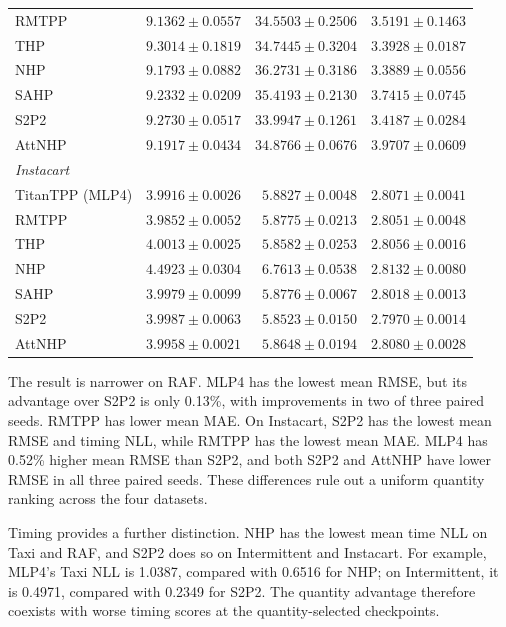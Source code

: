 \documentclass[runningheads]{llncs}
\begin{document}
\begin{table}[p]
\begin{tabular}{lrrr}
RMTPP & $\mathbf{9.1362\pm0.0557}$ & $34.5503\pm0.2506$ & $3.5191\pm0.1463$\\
THP & $9.3014\pm0.1819$ & $34.7445\pm0.3204$ & $3.3928\pm0.0187$\\
NHP & $9.1793\pm0.0882$ & $36.2731\pm0.3186$ & $\mathbf{3.3889\pm0.0556}$\\
SAHP & $9.2332\pm0.0209$ & $35.4193\pm0.2130$ & $3.7415\pm0.0745$\\
S2P2 & $9.2730\pm0.0517$ & $33.9947\pm0.1261$ & $3.4187\pm0.0284$\\
AttNHP & $9.1917\pm0.0434$ & $34.8766\pm0.0676$ & $3.9707\pm0.0609$\\
\midrule
\multicolumn{4}{l}{\textit{Instacart}}\\
TitanTPP (MLP4) & $3.9916\pm0.0026$ & $5.8827\pm0.0048$ & $2.8071\pm0.0041$\\
RMTPP & $\mathbf{3.9852\pm0.0052}$ & $5.8775\pm0.0213$ & $2.8051\pm0.0048$\\
THP & $4.0013\pm0.0025$ & $5.8582\pm0.0253$ & $2.8056\pm0.0016$\\
NHP & $4.4923\pm0.0304$ & $6.7613\pm0.0538$ & $2.8132\pm0.0080$\\
SAHP & $3.9979\pm0.0099$ & $5.8776\pm0.0067$ & $2.8018\pm0.0013$\\
S2P2 & $3.9987\pm0.0063$ & $\mathbf{5.8523\pm0.0150}$ & $\mathbf{2.7970\pm0.0014}$\\
AttNHP & $3.9958\pm0.0021$ & $5.8648\pm0.0194$ & $2.8080\pm0.0028$\\
\bottomrule
\end{tabular}
\end{table}

The result is narrower on RAF. MLP4 has the lowest mean RMSE, but its advantage over S2P2 is only 0.13\%, with improvements in two of three paired seeds. RMTPP has lower mean MAE. On Instacart, S2P2 has the lowest mean RMSE and timing NLL, while RMTPP has the lowest mean MAE. MLP4 has 0.52\% higher mean RMSE than S2P2, and both S2P2 and AttNHP have lower RMSE in all three paired seeds. These differences rule out a uniform quantity ranking across the four datasets.

Timing provides a further distinction. NHP has the lowest mean time NLL on Taxi and RAF, and S2P2 does so on Intermittent and Instacart. For example, MLP4's Taxi NLL is 1.0387, compared with 0.6516 for NHP; on Intermittent, it is 0.4971, compared with 0.2349 for S2P2. The quantity advantage therefore coexists with worse timing scores at the quantity-selected checkpoints.
\end{document}
